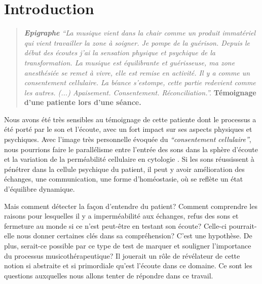 

\chapter{Introduction}



\begin{quotation}
 \textit{\textbf{Epigraphe  }   ``La musique vient dans la chair comme un produit immatériel
 qui vient travailler la zone à soigner. Je pompe de la
 guérison.
Depuis le début des écoutes j'ai la sensation physique et
 psychique de la
 transformation.
 La musique est équilibrante et guérisseuse, ma zone
 anesthésiée se remet à vivre, elle est remise en activité.
 Il y a comme un consentement cellulaire.
La béance s'estompe, cette
partie redevient comme les autres. (...)
Apaisement. Consentement. Réconciliation.''.} \textbf{Témoignage d'une
patiente lors d'une séance.}

\end{quotation}

Nous avons été très sensibles au témoignage de cette patiente dont le
processus a été porté par le son et l'écoute, avec un fort impact
sur ses aspects physiques
et psychiques.
Avec l'image très personnelle évoquée du
\textit{``consentement cellulaire''}, nous pourrions faire le
parallélisme entre l'entrée des sons dans la sphère d'écoute et la variation de la 
perméabilité cellulaire en cytologie \autocite[ch. 3 pp. 70--76]{marieb:biologie}. Si les sons réussissent à pénétrer dans la
cellule psychique du patient, il peut y avoir amélioration des
échanges, une 
communication, une forme d'homéostasie,  \autocite[ch. 1
pp. 10]{marieb:biologie} où se reflète un état d'équilibre dynamique.

Mais comment détecter la façon d'entendre du patient?
Comment comprendre les raisons pour lesquelles il y a imperméabilité
aux
échanges, refus des sons et fermeture au monde si ce n'est
peut-être  en testant
son écoute?  Celle-ci pourrait-elle nous donner certaines clés dans sa
compréhension? C'est une hypothèse.
De plus, serait-ce possible  par ce type de test 
de marquer et souligner l'importance du processus musicothérapeutique? 
Il jouerait un
rôle de
révélateur de cette notion si abstraite et si primordiale qu'est
l'écoute dans ce domaine.
Ce sont les questions auxquelles nous allons tenter de
répondre dans ce travail.


